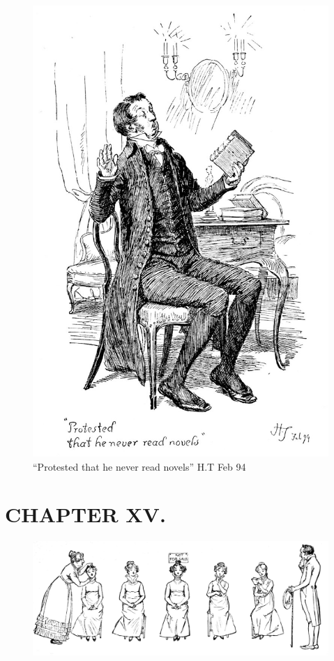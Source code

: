 \begin{figure}[htbp]
    \centering
    \includegraphics[width=\textwidth]{illustrations/i_116.jpg}
    \caption{“Protested that he never read novels” H.T Feb 94}
    \label{fig:image}
\end{figure}


\chapter{CHAPTER XV.}

\begin{figure}[htbp]
    \centering
    \includegraphics[width=\textwidth]{illustrations/i_118_a.jpg}
\end{figure}


